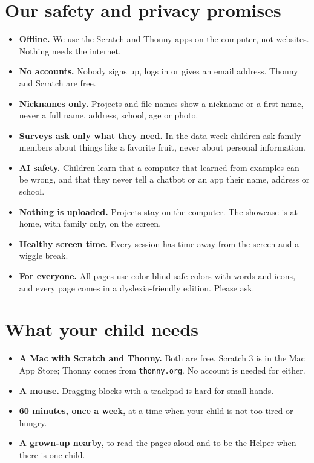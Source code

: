 \documentclass[track=junior,level=3]{kidscode}
\begin{document}
\section{Our safety and privacy promises}
\begin{safety}
\begin{itemize}[itemsep=2pt]
  \item \textbf{Offline.} We use the Scratch and Thonny apps on the computer, not websites. Nothing needs the internet.
  \item \textbf{No accounts.} Nobody signs up, logs in or gives an email address. Thonny and Scratch are free.
  \item \textbf{Nicknames only.} Projects and file names show a nickname or a first name, never a full
        name, address, school, age or photo.
  \item \textbf{Surveys ask only what they need.} In the data week children ask family members about
        things like a favorite fruit, never about personal information.
  \item \textbf{AI safety.} Children learn that a computer that learned from examples can be wrong, and
        that they never tell a chatbot or an app their name, address or school.
  \item \textbf{Nothing is uploaded.} Projects stay on the computer. The showcase is at home, with
        family only, on the screen.
  \item \textbf{Healthy screen time.} Every session has time away from the screen and a wiggle break.
  \item \textbf{For everyone.} All pages use color-blind-safe colors with words and icons, and every
        page comes in a dyslexia-friendly edition. Please ask.
\end{itemize}
\end{safety}

\section{What your child needs}
\begin{itemize}[itemsep=2pt]
  \item \textbf{A Mac with Scratch and Thonny.} Both are free. Scratch 3 is in the Mac App Store;
        Thonny comes from \texttt{thonny.org}. No account is needed for either.
  \item \textbf{A mouse.} Dragging blocks with a trackpad is hard for small hands.
  \item \textbf{60 minutes, once a week,} at a time when your child is not too tired or hungry.
  \item \textbf{A grown-up nearby,} to read the pages aloud and to be the Helper when there is one child.
\end{itemize}
\end{document}
